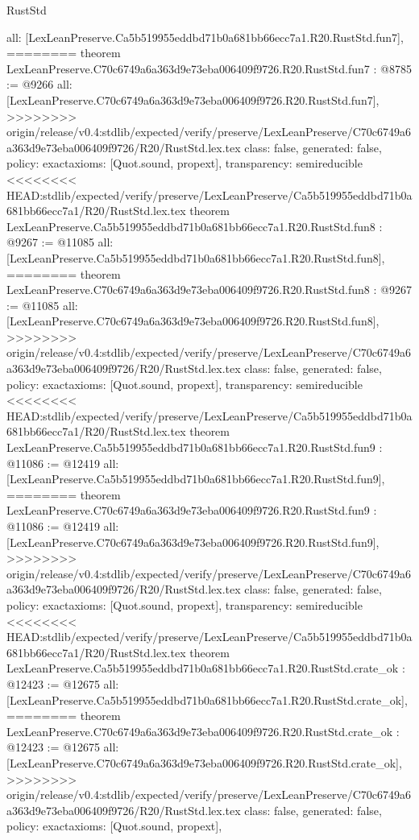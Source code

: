 \begin{lexlean}{RustStd}
\begin{coremodule}
{\begin{coremodule}
{{{{{{{{{{  all: [LexLeanPreserve.Ca5b519955eddbd71b0a681bb66ecc7a1.R20.RustStd.fun7],
========
theorem LexLeanPreserve.C70c6749a6a363d9e73eba006409f9726.R20.RustStd.fun7 : @8785 := @9266 {
  all: [LexLeanPreserve.C70c6749a6a363d9e73eba006409f9726.R20.RustStd.fun7],
>>>>>>>> origin/release/v0.4:stdlib/expected/verify/preserve/LexLeanPreserve/C70c6749a6a363d9e73eba006409f9726/R20/RustStd.lex.tex
  class: false,
  generated: false,
  policy: exact{axioms: [Quot.sound, propext]},
  transparency: semireducible
}
<<<<<<<< HEAD:stdlib/expected/verify/preserve/LexLeanPreserve/Ca5b519955eddbd71b0a681bb66ecc7a1/R20/RustStd.lex.tex
theorem LexLeanPreserve.Ca5b519955eddbd71b0a681bb66ecc7a1.R20.RustStd.fun8 : @9267 := @11085 {
  all: [LexLeanPreserve.Ca5b519955eddbd71b0a681bb66ecc7a1.R20.RustStd.fun8],
========
theorem LexLeanPreserve.C70c6749a6a363d9e73eba006409f9726.R20.RustStd.fun8 : @9267 := @11085 {
  all: [LexLeanPreserve.C70c6749a6a363d9e73eba006409f9726.R20.RustStd.fun8],
>>>>>>>> origin/release/v0.4:stdlib/expected/verify/preserve/LexLeanPreserve/C70c6749a6a363d9e73eba006409f9726/R20/RustStd.lex.tex
  class: false,
  generated: false,
  policy: exact{axioms: [Quot.sound, propext]},
  transparency: semireducible
}
<<<<<<<< HEAD:stdlib/expected/verify/preserve/LexLeanPreserve/Ca5b519955eddbd71b0a681bb66ecc7a1/R20/RustStd.lex.tex
theorem LexLeanPreserve.Ca5b519955eddbd71b0a681bb66ecc7a1.R20.RustStd.fun9 : @11086 := @12419 {
  all: [LexLeanPreserve.Ca5b519955eddbd71b0a681bb66ecc7a1.R20.RustStd.fun9],
========
theorem LexLeanPreserve.C70c6749a6a363d9e73eba006409f9726.R20.RustStd.fun9 : @11086 := @12419 {
  all: [LexLeanPreserve.C70c6749a6a363d9e73eba006409f9726.R20.RustStd.fun9],
>>>>>>>> origin/release/v0.4:stdlib/expected/verify/preserve/LexLeanPreserve/C70c6749a6a363d9e73eba006409f9726/R20/RustStd.lex.tex
  class: false,
  generated: false,
  policy: exact{axioms: [Quot.sound, propext]},
  transparency: semireducible
}
<<<<<<<< HEAD:stdlib/expected/verify/preserve/LexLeanPreserve/Ca5b519955eddbd71b0a681bb66ecc7a1/R20/RustStd.lex.tex
theorem LexLeanPreserve.Ca5b519955eddbd71b0a681bb66ecc7a1.R20.RustStd.crate_ok : @12423 := @12675 {
  all: [LexLeanPreserve.Ca5b519955eddbd71b0a681bb66ecc7a1.R20.RustStd.crate_ok],
========
theorem LexLeanPreserve.C70c6749a6a363d9e73eba006409f9726.R20.RustStd.crate_ok : @12423 := @12675 {
  all: [LexLeanPreserve.C70c6749a6a363d9e73eba006409f9726.R20.RustStd.crate_ok],
>>>>>>>> origin/release/v0.4:stdlib/expected/verify/preserve/LexLeanPreserve/C70c6749a6a363d9e73eba006409f9726/R20/RustStd.lex.tex
  class: false,
  generated: false,
  policy: exact{axioms: [Quot.sound, propext]},
}}}}}}}}}}}}}}
\end{coremodule}}
\end{coremodule}
\end{lexlean}
